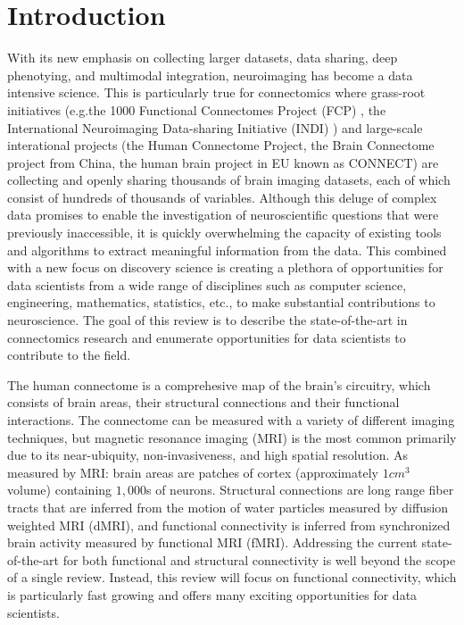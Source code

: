 \section*{Introduction}

With its new emphasis on collecting larger datasets, data sharing, deep phenotying, and multimodal integration, neuroimaging has become a data intensive science. This is particularly true for connectomics where grass-root initiatives (e.g.the 1000 Functional Connectomes Project (FCP) \cite{Biswal2010}, the International Neuroimaging Data-sharing Initiative (INDI) \cite{Mennes2013}) and large-scale interational projects (the Human Connectome Project\cite{Sotiropoulus2013,VanEssen2012}, the Brain Connectome project from China\cite{Jiang2013}, the human brain project in EU known as CONNECT\cite{Assaf2013}) are collecting and openly sharing thousands of brain imaging datasets, each of which consist of hundreds of thousands of variables. Although this deluge of complex data promises to enable the investigation of neuroscientific questions that were previously inaccessible, it is quickly overwhelming the capacity of existing tools and algorithms to extract meaningful information from the data. This combined with a new focus on discovery science is creating a plethora of opportunities for data scientists from a wide range of disciplines such as computer science, engineering, mathematics, statistics, etc., to make substantial contributions to neuroscience. The goal of this review is to describe the state-of-the-art in connectomics research and enumerate opportunities for data scientists to contribute to the field.

The human connectome is a comprehesive map of the brain's circuitry, which consists of brain areas, their structural connections and their functional interactions. The connectome can be measured with a variety of different imaging techniques, but magnetic resonance imaging (MRI) is the most common primarily due to its near-ubiquity, non-invasiveness, and high spatial resolution. As measured by MRI: brain areas are patches of cortex (approximately $1 cm^3$ volume) containing $1,000$s of neurons. Structural connections are long range fiber tracts that are inferred from the motion of water particles measured by diffusion weighted MRI (dMRI), and functional connectivity is inferred from synchronized brain activity measured by functional MRI (fMRI). Addressing the current state-of-the-art for both functional and structural connectivity is well beyond the scope of a single review. Instead, this review will focus on functional connectivity, which is particularly fast growing and offers many exciting opportunities for data scientists.

